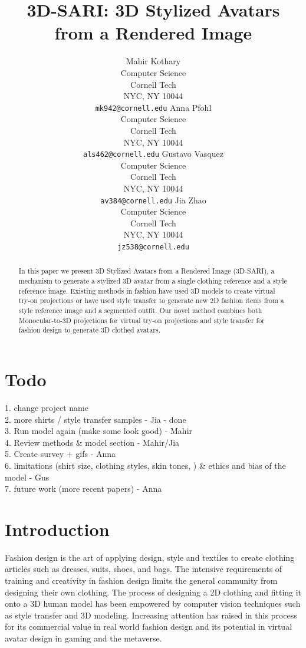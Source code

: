 \documentclass{article}
\title{3D-SARI: 3D Stylized Avatars from a Rendered Image}
\author{%
  Mahir Kothary\\
  Computer Science\\
  Cornell Tech\\
  NYC, NY 10044 \\
  \texttt{mk942@cornell.edu} 
 \And Anna Pfohl\\
  Computer Science\\
  Cornell Tech\\
  NYC, NY 10044 \\
  \texttt{als462@cornell.edu}
\AND
  Gustavo Vasquez \\
  Computer Science\\
  Cornell Tech\\
  NYC, NY 10044 \\
  \texttt{av384@cornell.edu}
\And
  Jia Zhao \\
  Computer Science\\
  Cornell Tech\\
  NYC, NY 10044 \\
  \texttt{jz538@cornell.edu}
}
\begin{document}
\maketitle


\begin{abstract}
In this paper we present 3D Stylized Avatars from a Rendered Image (3D-SARI), a mechanism to generate a stylized 3D avatar from a single clothing reference and a style reference image. Existing methods in fashion have used 3D models to create virtual try-on projections or have used style transfer to generate new 2D fashion items from a style reference image and a segmented outfit. Our novel method combines both Monocular-to-3D projections for virtual try-on projections and style transfer for fashion design to generate 3D clothed avatars.
\end{abstract}


\section*{Todo}
1. change project name \\ 
2. more shirts / style transfer samples - Jia - done\\ 
3. Run model again (make some look good) - Mahir  \\
4. Review methods \& model section - Mahir/Jia \\ 
5. Create survey + gifs - Anna \\
6. limitations (shirt size, clothing styles, skin tones, ) \& ethics and bias of the model - Gus \\ 
7. future work (more recent papers) - Anna \\


\section{Introduction}
Fashion design is the art of applying design, style and textiles to create clothing articles such as dresses, suits, shoes, and bags. The intensive requirements of training and creativity in fashion design limits the general community from designing their own clothing. The process of designing a 2D clothing and fitting it onto a 3D human model has been empowered by computer vision techniques such as style transfer and 3D modeling. Increasing attention has raised in this process for its commercial value in real world fashion design and its potential in virtual avatar design in gaming and the metaverse.
\end{document}
